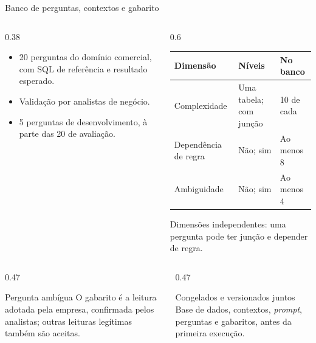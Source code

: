 \documentclass[aspectratio=169,10pt]{beamer}
\newcommand{\cab}[1]{\textcolor{UnBAzul}{\textbf{#1}}}
\begin{document}
\begin{frame}{Banco de perguntas, contextos e gabarito}
  \begin{columns}[T,onlytextwidth]
    \begin{column}{0.38\textwidth}
      \small
      \begin{itemize}
        \item 20 perguntas do domínio comercial, com SQL de referência e resultado esperado.
        \item Validação por analistas de negócio.
        \item 5 perguntas de desenvolvimento, à parte das 20 de avaliação.
      \end{itemize}
    \end{column}
    \begin{column}{0.6\textwidth}
      \footnotesize
      \begin{tabular}{@{}lll@{}}
        \toprule
        \cab{Dimensão} & \cab{Níveis} & \cab{No banco}\\
        \midrule
        Complexidade & Uma tabela; com junção & 10 de cada\\
        Dependência de regra & Não; sim & Ao menos 8\\
        Ambiguidade & Não; sim & Ao menos 4\\
        \bottomrule
      \end{tabular}

      \vspace{1mm}
      {\scriptsize\color{UnBCinza}Dimensões independentes: uma pergunta pode ter junção e depender de regra.}
      \vspace{1mm}
    \end{column}
  \end{columns}
  \vspace{2mm}
  \begin{columns}[T,onlytextwidth]
    \begin{column}{0.47\textwidth}
      \begin{block}{Pergunta ambígua}
        \small
        O gabarito é a leitura adotada pela empresa, confirmada pelos analistas;
        outras leituras legítimas também são aceitas.
      \end{block}
    \end{column}
    \begin{column}{0.47\textwidth}
      \begin{exampleblock}{Congelados e versionados juntos}
        \small
        Base de dados, contextos, \textit{prompt}, perguntas e gabaritos,
        antes da primeira execução.
      \end{exampleblock}
    \end{column}
  \end{columns}
\end{frame}
\end{document}
